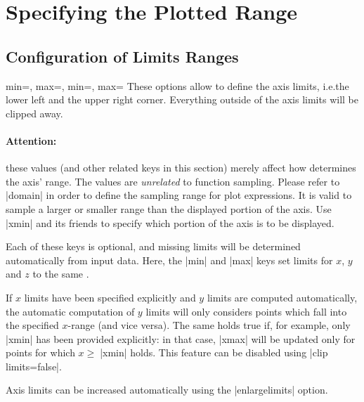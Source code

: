 
\section{Specifying the Plotted Range}

\subsection{Configuration of Limits Ranges}

\begin{pgfplotsxykeylist}{%
    \x min=,
    \x max=,
    min=,
    max=%
}
    These options allow to define the axis limits, i.e.\@ the lower left and
    the upper right corner. Everything outside of the axis limits will be
    clipped away.


    \paragraph{Attention:}

    these values (and other related keys in this section) merely affect how
    \PGFPlots{} determines the axis' range. The values are \emph{unrelated} to
    function sampling. Please refer to |domain| in order to define the sampling
    range for plot expressions. It is valid to sample a larger or smaller range
    than the displayed portion of the axis. Use |xmin| and its friends to
    specify which portion of the axis is to be displayed.

    Each of these keys is optional, and missing limits will be determined
    automatically from input data. Here, the |min| and |max| keys set limits
    for $x$, $y$ and $z$ to the same .

    If $x$ limits have been specified explicitly and $y$ limits are computed
    automatically, the automatic computation of $y$ limits will only considers
    points which fall into the specified $x$-range (and vice versa). The same
    holds true if, for example, only |xmin| has been provided explicitly: in
    that case, |xmax| will be updated only for points for which $x \ge
    \;$|xmin| holds. This feature can be disabled using |clip limits=false|.

    Axis limits can be increased automatically using the |enlargelimits|
    option.
\begin{codeexample}[]
\end{codeexample}


\end{pgfplotsxykeylist}
